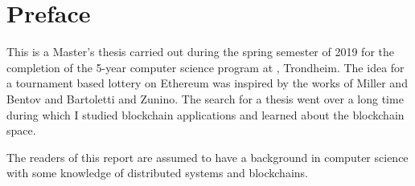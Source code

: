 \hypersetup{pageanchor=false}
%

\chapter*{Preface}


This is a Master's thesis carried out during the spring semester of 2019 for the completion of the 5-year computer science program at \NTNU, Trondheim.
The idea for a tournament based lottery on Ethereum was inspired by the works of Miller and Bentov and Bartoletti and Zunino. The search for a thesis went over a long time during which I studied blockchain applications and learned about the blockchain space.

The readers of this report are assumed to have a background in computer science with some knowledge of distributed systems and blockchains.

\begin{center}
\thesisdate \\[1pc]
\thesisauthor
\end{center}
